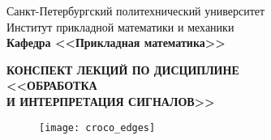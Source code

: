 \documentclass[main.tex]{subfiles}
\begin{document}
\begin{titlepage}
\begin{center}
	\begin{large}
		Санкт-Петербургский политехнический университет\\
		Институт прикладной математики и механики\\
		\textbf{Кафедра <<Прикладная математика>>}\\
	\end{large}
	\vfill
	\Large{\textbf{КОНСПЕКТ ЛЕКЦИЙ ПО ДИСЦИПЛИНЕ \\
			 <<ОБРАБОТКА \\
			 И ИНТЕРПРЕТАЦИЯ СИГНАЛОВ>>}}
\end{center}
\vfill
\begin{figure}[H]
	\centering \texttt{[image: croco\_edges]}
\end{figure}
\vfill
{}
\end{titlepage}
\end{document}
